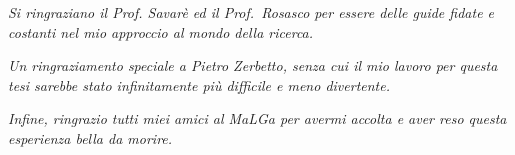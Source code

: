 \emph{Si ringraziano il Prof. Savarè ed il Prof.\ Rosasco per essere delle guide fidate e costanti nel mio approccio al mondo della ricerca.}

\bigskip 

\emph{Un ringraziamento speciale a Pietro Zerbetto, senza cui il mio lavoro per questa tesi sarebbe stato infinitamente più difficile e meno divertente.
}

\bigskip 

\emph{Infine, ringrazio tutti miei amici al MaLGa per avermi accolta e aver reso questa esperienza bella da morire.}